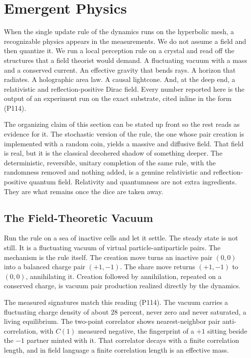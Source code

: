 \section{Emergent Physics}

When the single update rule of the dynamics runs on the hyperbolic mesh, a recognizable physics appears in the measurements. We do not assume a field and then quantize it. We run a local perception rule on a crystal and read off the structures that a field theorist would demand. A fluctuating vacuum with a mass and a conserved current. An effective gravity that bends rays. A horizon that radiates. A holographic area law. A causal lightcone. And, at the deep end, a relativistic and reflection-positive Dirac field. Every number reported here is the output of an experiment run on the exact substrate, cited inline in the form (P114).

The organizing claim of this section can be stated up front so the rest reads as evidence for it. The stochastic version of the rule, the one whose pair creation is implemented with a random coin, yields a massive and diffusive field. That field is real, but it is the classical decohered shadow of something deeper. The deterministic, reversible, unitary completion of the same rule, with the randomness removed and nothing added, is a genuine relativistic and reflection-positive quantum field. Relativity and quantumness are not extra ingredients. They are what remains once the dice are taken away.

\subsection{The Field-Theoretic Vacuum}

Run the rule on a sea of inactive cells and let it settle. The steady state is not still. It is a fluctuating vacuum of virtual particle-antiparticle pairs. The mechanism is the rule itself. The creation move turns an inactive pair $(0,0)$ into a balanced charge pair $(+1,-1)$. The share move returns $(+1,-1)$ to $(0,0)$, annihilating it. Creation followed by annihilation, repeated on a conserved charge, is vacuum pair production realized directly by the dynamics.

The measured signatures match this reading (P114). The vacuum carries a fluctuating charge density of about $28$ percent, never zero and never saturated, a living equilibrium. The two-point correlator shows nearest-neighbor pair anti-correlation, with $C(1)$ measured negative, the fingerprint of a $+1$ sitting beside the $-1$ partner minted with it. That correlator decays with a finite correlation length, and in field language a finite correlation length is an effective mass.


